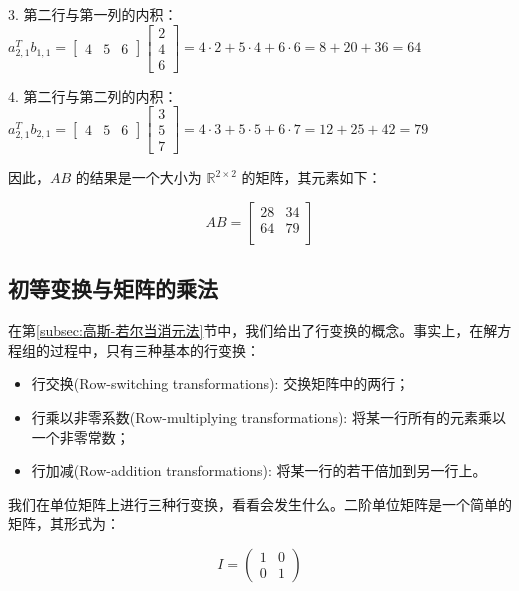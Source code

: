 \begin{exercise}
3. 第二行与第一列的内积： $a_{2,1}^T b_{1,1} = \begin{bmatrix} 4 & 5 & 6 \end{bmatrix} \begin{bmatrix} 2 \\ 4 \\ 6 \end{bmatrix} = 4 \cdot 2 + 5 \cdot 4 + 6 \cdot 6 = 8 + 20 + 36 = 64$

4. 第二行与第二列的内积： $a_{2,1}^T b_{2,1} = \begin{bmatrix} 4 & 5 & 6 \end{bmatrix} \begin{bmatrix} 3 \\ 5 \\ 7 \end{bmatrix} = 4 \cdot 3 + 5 \cdot 5 + 6 \cdot 7 = 12 + 25 + 42 = 79$

因此，$AB$ 的结果是一个大小为 $\mathbb{R}^{2 \times 2}$ 的矩阵，其元素如下：

\begin{equation*}
AB = \begin{bmatrix}
28 & 34 \\
64 & 79 \\
\end{bmatrix}
\end{equation*}

\end{exercise}

\subsection{初等变换与矩阵的乘法}
\label{subsec:初等变换与矩阵的乘法}

在第\ref{subsec:高斯-若尔当消元法}节中，我们给出了行变换的概念。事实上，在解方程组的过程中，只有三种基本的行变换：
\begin{itemize}
    \item 行交换(Row-switching transformations): 交换矩阵中的两行；
    \item 行乘以非零系数(Row-multiplying transformations): 将某一行所有的元素乘以一个非零常数；
    \item 行加减(Row-addition transformations): 将某一行的若干倍加到另一行上。
\end{itemize}

我们在单位矩阵上进行三种行变换，看看会发生什么。二阶单位矩阵是一个简单的矩阵，其形式为：

\[ I = \begin{pmatrix} 1 & 0 \\ 0 & 1 \end{pmatrix} \]

